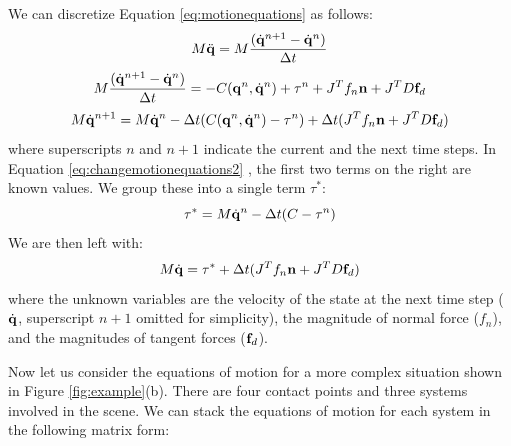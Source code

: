 We can discretize Equation \ref{eq:motionequations} as follows:
\begin{equation}
\label{eq:changemotionequations0}
M\ddot{\mathbf{q}} = M\frac{(\dot{\mathbf{q}}^{n+1}-\dot{\mathbf{q}}^n)}{\Delta{t}}
\end{equation}
\begin{equation}
\label{eq:changemotionequations1}
M\frac{(\dot{\mathbf{q}}^{n+1}-\dot{\mathbf{q}}^n)}{\Delta{t}} = -C(\mathbf{q}^n, \dot{\mathbf{q}}^n) + \tau^n + J^Tf_n\mathbf{n} + J^TD\mathbf{f}_d 
\end{equation}
\begin{equation}
\label{eq:changemotionequations2}
M\dot{\mathbf{q}}^{n+1} = M\dot{\mathbf{q}}^n - \Delta{t}(C(\mathbf{q}^n, \dot{\mathbf{q}}^n) - \tau^n) + \Delta{t}(J^Tf_n\mathbf{n} + J^TD\mathbf{f}_d)
\end{equation}
where superscripts $n$ and $n+1$ indicate the current and the next time
steps. In Equation \ref{eq:changemotionequations2} , the first two terms on the right are known values. 
We group these into a single term $\tau^*$:
\begin{equation}
\label{eq:taustar}
\tau^* = M\dot{\mathbf{q}}^n - \Delta{t}(C - \tau^n)
\end{equation}
We are then left with:
\begin{equation}
\label{eq:changemotionequations3}
M\dot{\mathbf{q}} = \tau^* + \Delta{t}(J^Tf_n\mathbf{n} + J^TD\mathbf{f}_d)
\end{equation}
where the unknown variables are the velocity of the state at the next time
step ($\dot{\mathbf{q}}$, superscript $n+1$ omitted for simplicity), the magnitude
of normal force ($f_n$), and the magnitudes of tangent forces ($\mathbf{f}_d$). 

Now let us consider the equations of motion for a more complex
situation shown in Figure \ref{fig:example}(b). There are four contact
points and three systems involved in the scene. We can stack the
equations of motion for each system in the following matrix form:

